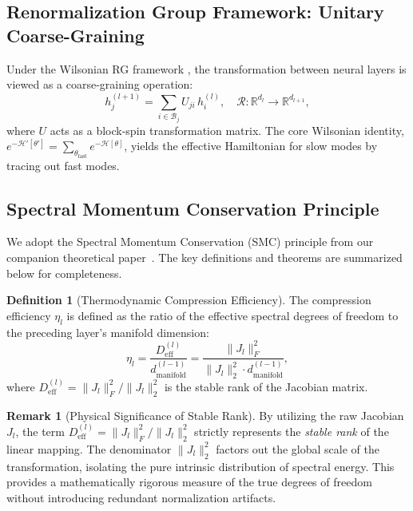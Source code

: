 \documentclass[11pt, a4paper]{article}
\theoremstyle{definition}
\newtheorem{definition}{Definition}[section]
\newtheorem{remark}{Remark}[section]
\begin{document}
\subsection{Renormalization Group Framework: Unitary Coarse-Graining}
\label{subsec:rg}

Under the Wilsonian RG framework \cite{wilson1975renormalization}, the transformation between neural layers is viewed as a coarse-graining operation:
\begin{equation}
    h^{(l+1)}_j = \sum_{i \in \mathcal{B}_j} U_{ji} \, h^{(l)}_i, \quad \mathcal{R}: \mathbb{R}^{d_l} \to \mathbb{R}^{d_{l+1}},
\end{equation}
where $U$ acts as a block-spin transformation matrix. The core Wilsonian identity, $e^{-\mathcal{H}'[\theta']} = \sum_{\theta_{\text{fast}}} e^{-\mathcal{H}[\theta]}$, yields the effective Hamiltonian for slow modes by tracing out fast modes.

\subsection{Spectral Momentum Conservation Principle}

We adopt the Spectral Momentum Conservation (SMC) principle from our companion theoretical paper~\cite{liu2024unified}. The key definitions and theorems are summarized below for completeness.

\begin{definition}[Thermodynamic Compression Efficiency]
\label{def:compression-efficiency}
The compression efficiency $\eta_l$ is defined as the ratio of the effective spectral degrees of freedom to the preceding layer's manifold dimension:
\begin{equation}
    \boxed{\eta_l = \frac{D_{\text{eff}}^{(l)}}{d_{\text{manifold}}^{(l-1)}} = \frac{\|J_l\|_F^2}{\|J_l\|_2^2 \cdot d_{\text{manifold}}^{(l-1)}}},
\end{equation}
where $D_{\text{eff}}^{(l)} = \|J_l\|_F^2 / \|J_l\|_2^2$ is the stable rank of the Jacobian matrix.
\end{definition}

\begin{remark}[Physical Significance of Stable Rank]
\label{rem:stable-rank}
By utilizing the raw Jacobian $J_l$, the term $D_{\text{eff}}^{(l)} = \|J_l\|_F^2 / \|J_l\|_2^2$ strictly represents the \textit{stable rank} of the linear mapping. The denominator $\|J_l\|_2^2$ factors out the global scale of the transformation, isolating the pure intrinsic distribution of spectral energy. This provides a mathematically rigorous measure of the true degrees of freedom without introducing redundant normalization artifacts.
\end{remark}
\end{document}
